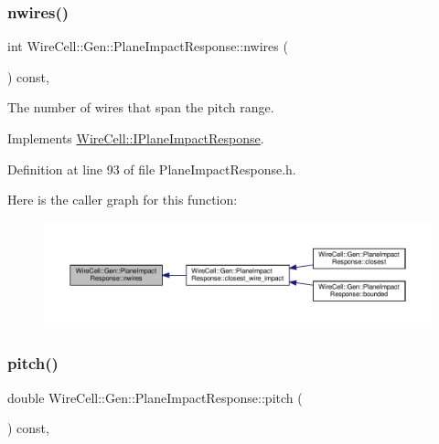 \subsubsection{\texorpdfstring{nwires()}{nwires()}}
{\footnotesize\ttfamily int Wire\+Cell\+::\+Gen\+::\+Plane\+Impact\+Response\+::nwires (\begin{DoxyParamCaption}{ }\end{DoxyParamCaption}) const\hspace{0.3cm}{\ttfamily [inline]}, {\ttfamily [virtual]}}



The number of wires that span the pitch range. 



Implements \hyperlink{class_wire_cell_1_1_i_plane_impact_response_abe58b933a8ba84911d705f46f277b306}{Wire\+Cell\+::\+I\+Plane\+Impact\+Response}.



Definition at line 93 of file Plane\+Impact\+Response.\+h.

Here is the caller graph for this function\+:
\nopagebreak
\begin{figure}[H]
\begin{center}
\leavevmode
\includegraphics[width=350pt]{class_wire_cell_1_1_gen_1_1_plane_impact_response_a8fc3604f6bd80d29095f205c59b768c2_icgraph}
\end{center}
\end{figure}
\mbox{\label{class_wire_cell_1_1_gen_1_1_plane_impact_response_a350984012f21b48b8ab4515a371a3f8c}} 
\subsubsection{\texorpdfstring{pitch()}{pitch()}}
{\footnotesize\ttfamily double Wire\+Cell\+::\+Gen\+::\+Plane\+Impact\+Response\+::pitch (\begin{DoxyParamCaption}{ }\end{DoxyParamCaption}) const\hspace{0.3cm}{\ttfamily [inline]}, {\ttfamily [virtual]}}



